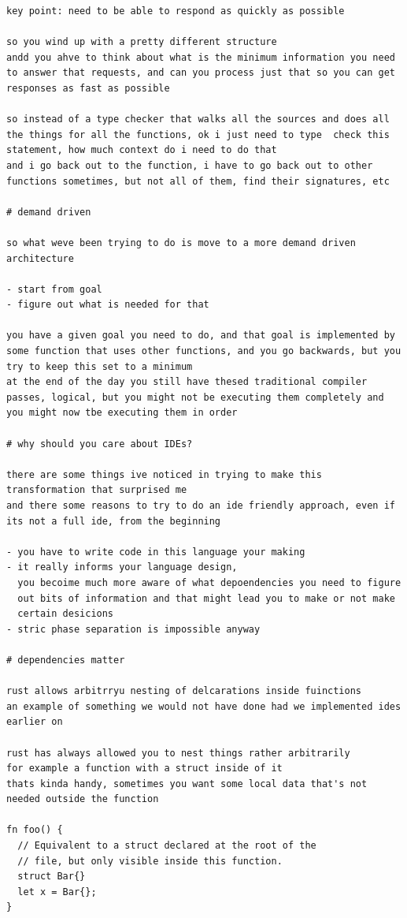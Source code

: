 \documentclass[12pt, a4paper]{report}
\begin{document}
\begin{verbatim}
key point: need to be able to respond as quickly as possible

so you wind up with a pretty different structure
andd you ahve to think about what is the minimum information you need
to answer that requests, and can you process just that so you can get
responses as fast as possible

so instead of a type checker that walks all the sources and does all
the things for all the functions, ok i just need to type  check this
statement, how much context do i need to do that
and i go back out to the function, i have to go back out to other
functions sometimes, but not all of them, find their signatures, etc

# demand driven

so what weve been trying to do is move to a more demand driven
architecture

- start from goal
- figure out what is needed for that

you have a given goal you need to do, and that goal is implemented by
some function that uses other functions, and you go backwards, but you
try to keep this set to a minimum
at the end of the day you still have thesed traditional compiler
passes, logical, but you might not be executing them completely and
you might now tbe executing them in order

# why should you care about IDEs?

there are some things ive noticed in trying to make this
transformation that surprised me
and there some reasons to try to do an ide friendly approach, even if
its not a full ide, from the beginning

- you have to write code in this language your making
- it really informs your language design,
  you becoime much more aware of what depoendencies you need to figure
  out bits of information and that might lead you to make or not make
  certain desicions
- stric phase separation is impossible anyway

# dependencies matter

rust allows arbitrryu nesting of delcarations inside fuinctions
an example of something we would not have done had we implemented ides
earlier on

rust has always allowed you to nest things rather arbitrarily
for example a function with a struct inside of it
thats kinda handy, sometimes you want some local data that's not
needed outside the function

fn foo() {
  // Equivalent to a struct declared at the root of the
  // file, but only visible inside this function.
  struct Bar{}
  let x = Bar{};
}


\end{verbatim}
\end{document}
